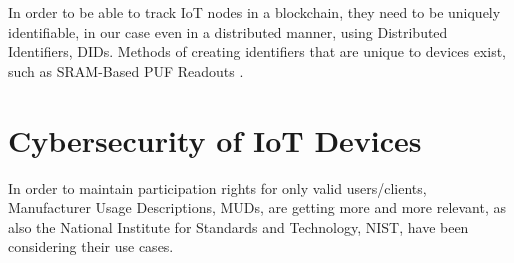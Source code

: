 In order to be able to track IoT nodes in a blockchain, they need to be uniquely identifiable, in our case even in a
distributed manner, using Distributed Identifiers, DIDs. Methods of creating identifiers that are unique to devices
exist, such as SRAM-Based PUF Readouts \cite{vinagrero2023sram}.

\section{Cybersecurity of IoT Devices}

In order to maintain participation rights for only valid users/clients, Manufacturer Usage Descriptions, MUDs, are
getting more and more relevant, as also the National Institute for Standards and Technology, NIST, have been considering
their use cases. \cite{dodson2021securing}
